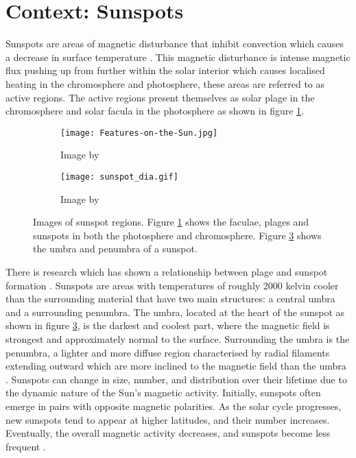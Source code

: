 \documentclass[10pt]{article}
\begin{document}
\newpage

\section{Context: Sunspots}

Sunspots are areas of magnetic disturbance that inhibit convection which causes a decrease in surface temperature \citep{noaa}. This magnetic disturbance is intense magnetic flux pushing up from further within the solar interior which causes localised heating in the chromosphere and photosphere, these areas are referred to as active regions. The active regions present themselves as solar plage in the chromosphere and solar facula in the photosphere as shown in figure \ref{fig:sun}.

\begin{figure}[H]
	\begin{subfigure}[t]{0.602\textwidth}
		\centering
		\texttt{[image: Features-on-the-Sun.jpg]}
		\caption{Image by \citet{dave2018}}
		\label{fig:sun}
	\end{subfigure}
	\begin{subfigure}[t]{0.4\textwidth}
		\centering
		\texttt{[image: sunspot\_dia.gif]}
		\caption{Image by \citet{umbra}}
		\label{fig:umbra}
	\end{subfigure}
	\caption{Images of sunspot regions. Figure \ref{fig:sun} shows the faculae, plages and sunspots in both the photosphere and chromosphere. Figure \ref{fig:umbra} shows the umbra and penumbra of a sunspot. }
\end{figure}

\noindent There is research which has shown a relationship between plage and sunspot formation \citep{theo2022}. Sunspots are areas with temperatures of roughly 2000 kelvin cooler than the surrounding material that have two main structures: a central umbra and a surrounding penumbra. The umbra, located at the heart of the sunspot as shown in figure \ref{fig:umbra}, is the darkest and coolest part, where the magnetic field is strongest and approximately normal to the surface. Surrounding the umbra is the penumbra, a lighter and more diffuse region characterised by radial filaments extending outward which are more inclined to the magnetic field than the umbra \citep{penumbra}. Sunspots can change in size, number, and distribution over their lifetime due to the dynamic nature of the Sun's magnetic activity. Initially, sunspots often emerge in pairs with opposite magnetic polarities. As the solar cycle progresses, new sunspots tend to appear at higher latitudes, and their number increases. Eventually, the overall magnetic activity decreases, and sunspots become less frequent \citep{noaa}.
\end{document}
